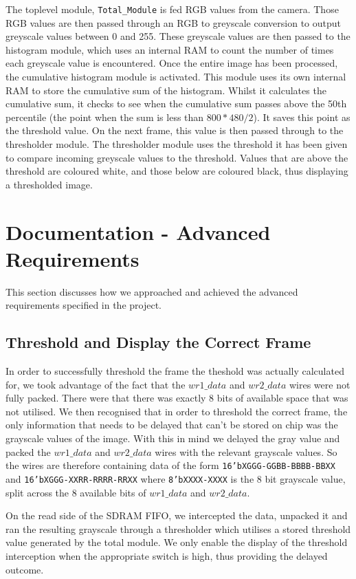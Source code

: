 \documentclass[12pt]{article}
\begin{document}
  The toplevel module, \texttt{Total\_Module} is fed RGB values from the camera. Those RGB values are then passed through an RGB to greyscale conversion to output greyscale values between 0 and 255. These greyscale values are then passed to the histogram module, which uses an internal RAM to count the number of times each greyscale value is encountered. Once the entire image has been processed, the cumulative histogram module is activated. This module uses its own internal RAM to store the cumulative sum of the histogram. Whilst it calculates the cumulative sum, it checks to see when the cumulative sum passes above the 50th percentile (the point when the sum is less than \(800*480/2\)). It saves this point as the threshold value. On the next frame, this value is then passed through to the thresholder module. The thresholder module uses the threshold it has been given to compare incoming greyscale values to the threshold. Values that are above the threshold are coloured white, and those below are coloured black, thus displaying a thresholded image.
  
  \section{Documentation - Advanced Requirements}
  This section discusses how we approached and achieved the advanced requirements specified in the project.
  
  \subsection{Threshold and Display the Correct Frame}
  In order to successfully threshold the frame the theshold was actually calculated for, we took advantage of the fact that the \(wr1\_data\) and \(wr2\_data\) wires were not fully packed. There were that there was exactly 8 bits of available space that was not utilised. We then recognised that in order to threshold the correct frame, the only information that needs to be delayed that can't be stored on chip was the grayscale values of the image. With this in mind we delayed the gray value and packed the \(wr1\_data\) and \(wr2\_data\) wires with the relevant grayscale values. So the wires are therefore containing data of the form \texttt{16'bXGGG-GGBB-BBBB-BBXX} and \texttt{16'bXGGG-XXRR-RRRR-RRXX} where \texttt{8'bXXXX-XXXX} is the 8 bit grayscale value, split across the 8 available bits of \(wr1\_data\) and \(wr2\_data\).

  On the read side of the SDRAM FIFO, we intercepted the data, unpacked it and ran the resulting grayscale through a thresholder which utilises a stored threshold value generated by the total module. We only enable the display of the threshold interception when the appropriate switch is high, thus providing the delayed outcome.
\end{document}
